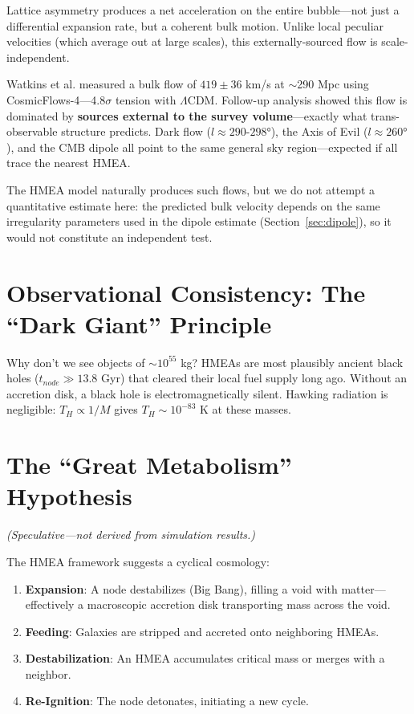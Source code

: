 \documentclass{article}
\begin{document}
Lattice asymmetry produces a net acceleration on the entire bubble—not just a differential expansion rate, but a coherent bulk motion.
Unlike local peculiar velocities (which average out at large scales), this externally-sourced flow is scale-independent.

Watkins et al. \cite{Watkins2023} measured a bulk flow of $419 \pm 36$ km/s at $\sim$290 Mpc using CosmicFlows-4—4.8$\sigma$ tension with $\Lambda$CDM.
Follow-up analysis \cite{Watkins2025} showed this flow is dominated by \textbf{sources external to the survey volume}—exactly what trans-observable structure predicts.
Dark flow ($l \approx 290$-$298°$), the Axis of Evil ($l \approx 260°$), and the CMB dipole all point to the same general sky region—expected if all trace the nearest HMEA.

The HMEA model naturally produces such flows, but we do not attempt a quantitative estimate here: the predicted bulk velocity depends on the same irregularity parameters used in the dipole estimate (Section~\ref{sec:dipole}), so it would not constitute an independent test.

\section{Observational Consistency: The ``Dark Giant'' Principle}
\label{sec:defenses}
Why don't we see objects of $\sim 10^{55}$ kg?
HMEAs are most plausibly ancient black holes ($t_{node} \gg 13.8$ Gyr) that cleared their local fuel supply long ago.
Without an accretion disk, a black hole is electromagnetically silent.
Hawking radiation is negligible: $T_H \propto 1/M$ gives $T_H \sim 10^{-83}$ K at these masses.

\section{The ``Great Metabolism'' Hypothesis}
\label{sec:metabolism}
\textit{(Speculative---not derived from simulation results.)}

The HMEA framework suggests a cyclical cosmology:
\begin{enumerate}
\item \textbf{Expansion}: A node destabilizes (Big Bang), filling a void with matter—effectively a macroscopic accretion disk transporting mass across the void.
\item \textbf{Feeding}: Galaxies are stripped and accreted onto neighboring HMEAs.
\item \textbf{Destabilization}: An HMEA accumulates critical mass or merges with a neighbor.
\item \textbf{Re-Ignition}: The node detonates, initiating a new cycle.
\end{enumerate}
\end{document}
